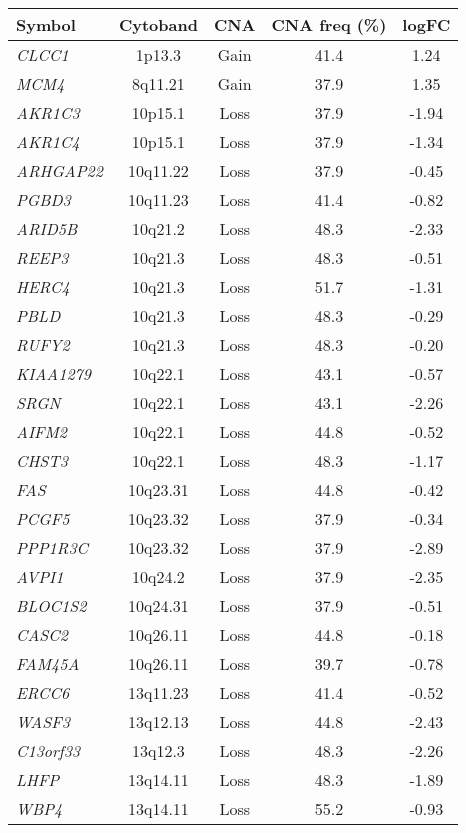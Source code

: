 \begin{table}[htbp]
	\centering
	\small
		\begin{tabular}[c]{|lcccc|}
		\hline
		Symbol & Cytoband & CNA & CNA freq (\%) & logFC\\
		\hline
		{\it CLCC1} & 1p13.3 & Gain & 41.4 & 1.24\\
		{\it MCM4} & 8q11.21 & Gain & 37.9 & 1.35\\
		{\it AKR1C3} & 10p15.1 & Loss & 37.9 & -1.94\\
		{\it AKR1C4} & 10p15.1 & Loss & 37.9 & -1.34\\
		{\it ARHGAP22} & 10q11.22 & Loss & 37.9 & -0.45\\
		{\it PGBD3} & 10q11.23 & Loss & 41.4 & -0.82\\
		{\it ARID5B} & 10q21.2 & Loss & 48.3 & -2.33\\
		{\it REEP3} & 10q21.3 & Loss & 48.3 & -0.51\\
		{\it HERC4} & 10q21.3 & Loss & 51.7 & -1.31\\
		{\it PBLD} & 10q21.3 & Loss & 48.3 & -0.29\\
		{\it RUFY2} & 10q21.3 & Loss & 48.3 & -0.20\\
		{\it KIAA1279} & 10q22.1 & Loss & 43.1 & -0.57\\
		{\it SRGN} & 10q22.1 & Loss & 43.1 & -2.26\\
		{\it AIFM2} & 10q22.1 & Loss & 44.8 & -0.52\\
		{\it CHST3} & 10q22.1 & Loss & 48.3 & -1.17\\
		{\it FAS} & 10q23.31 & Loss & 44.8 & -0.42\\
		{\it PCGF5} & 10q23.32 & Loss & 37.9 & -0.34\\
		{\it PPP1R3C} & 10q23.32 & Loss & 37.9 & -2.89\\
		{\it AVPI1} & 10q24.2 & Loss & 37.9 & -2.35\\
		{\it BLOC1S2} & 10q24.31 & Loss & 37.9 & -0.51\\
		{\it CASC2} & 10q26.11 & Loss & 44.8 & -0.18\\
		{\it FAM45A} & 10q26.11 & Loss & 39.7 & -0.78\\
		{\it ERCC6} & 13q11.23 & Loss & 41.4 & -0.52\\
		{\it WASF3} & 13q12.13 & Loss & 44.8 & -2.43\\
		{\it C13orf33} & 13q12.3 & Loss & 48.3 & -2.26\\
		{\it LHFP} & 13q14.11 & Loss & 48.3 & -1.89\\
		{\it WBP4} & 13q14.11 & Loss & 55.2 & -0.93\\

\end{tabular}
\end{table}
